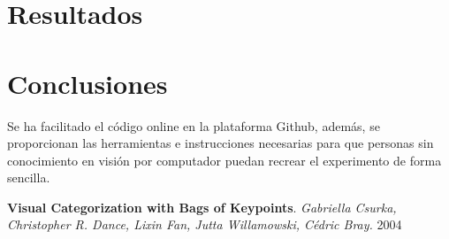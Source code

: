 \documentclass[a4paper,12pt]{article}
\begin{document}


\newpage
\section{Resultados}




\newpage
\section{Conclusiones}





Se ha facilitado el código online en la plataforma Github, además, se 
proporcionan las herramientas e instrucciones necesarias para que personas sin 
conocimiento en visión por computador puedan recrear el experimento de forma
sencilla. 


\newpage
\begin{thebibliography}{99}

 \textbf{Visual Categorization with Bags of Keypoints}. 
 \emph{Gabriella Csurka, Christopher R. Dance, Lixin Fan, Jutta Willamowski, Cédric Bray.}
 2004 

\end{thebibliography}
\end{document}
